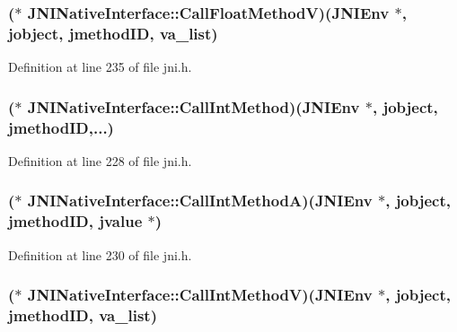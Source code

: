 \hypertarget{struct_j_n_i_native_interface_adb3ba7d4a0cdd76fe0a0a38b838be00a}{
\subsubsection[{Call\-Float\-Method\-V}]{($\ast$ J\-N\-I\-Native\-Interface\-::\-Call\-Float\-Method\-V)({\bf J\-N\-I\-Env} $\ast$, {\bf jobject}, {\bf jmethod\-I\-D}, va\-\_\-list)}}\label{struct_j_n_i_native_interface_adb3ba7d4a0cdd76fe0a0a38b838be00a}


Definition at line 235 of file jni.\-h.

\hypertarget{struct_j_n_i_native_interface_ac16f1795d01192107bf9a894edd546a9}{
\subsubsection[{Call\-Int\-Method}]{($\ast$ J\-N\-I\-Native\-Interface\-::\-Call\-Int\-Method)({\bf J\-N\-I\-Env} $\ast$, {\bf jobject}, {\bf jmethod\-I\-D},...)}}\label{struct_j_n_i_native_interface_ac16f1795d01192107bf9a894edd546a9}


Definition at line 228 of file jni.\-h.

\hypertarget{struct_j_n_i_native_interface_a7657b27c49afe9986b12ab08fb7847a1}{
\subsubsection[{Call\-Int\-Method\-A}]{($\ast$ J\-N\-I\-Native\-Interface\-::\-Call\-Int\-Method\-A)({\bf J\-N\-I\-Env} $\ast$, {\bf jobject}, {\bf jmethod\-I\-D}, {\bf jvalue} $\ast$)}}\label{struct_j_n_i_native_interface_a7657b27c49afe9986b12ab08fb7847a1}


Definition at line 230 of file jni.\-h.

\hypertarget{struct_j_n_i_native_interface_aca60f5527ccb30dcfdaf1fa32b4b65a3}{
\subsubsection[{Call\-Int\-Method\-V}]{($\ast$ J\-N\-I\-Native\-Interface\-::\-Call\-Int\-Method\-V)({\bf J\-N\-I\-Env} $\ast$, {\bf jobject}, {\bf jmethod\-I\-D}, va\-\_\-list)}}\label{struct_j_n_i_native_interface_aca60f5527ccb30dcfdaf1fa32b4b65a3}


